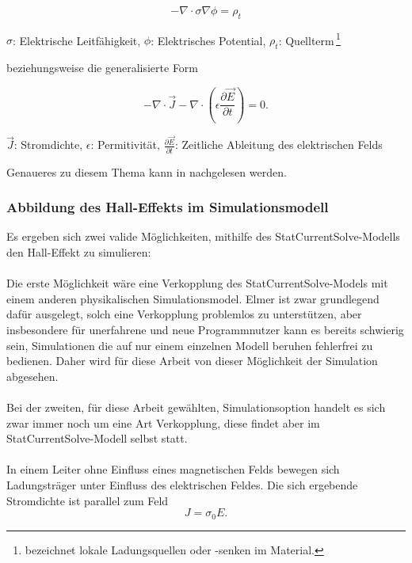 \documentclass[12pt, a4paper]{article}
\renewcommand{\footnotesize}{\fontsize{10pt}{12pt}\selectfont}
\begin{document}
\begin{equation}
	-\nabla\cdot\sigma\nabla\phi=\rho_t
	\tag{4.7}
	\label{4.7}
\end{equation}

\vspace{-0.8em}
\begin{center}
	\footnotesize
	$\sigma$: Elektrische Leitfähigkeit, $\phi$: Elektrisches Potential, $\rho_t$: Quellterm\,\footnote{bezeichnet lokale Ladungsquellen oder -senken im Material.}
\end{center}
\raggedright

beziehungsweise die generalisierte Form

\begin{equation}
	-\nabla\cdot\vec{J}-\nabla\cdot(\epsilon\frac{\partial\vec{E}}{\partial{t}})=0.
	\tag{4.8}
	\label{4.8}
\end{equation}

\vspace{-0.8em}
\begin{center}
	\footnotesize
	$\vec{J}$: Stromdichte, $\epsilon$: Permitivität, $\frac{\partial\vec{E}}{\partial{t}}$: Zeitliche Ableitung des elektrischen Felds
\end{center}

Genaueres zu diesem Thema kann in \cite{elmerModel} nachgelesen werden.

\subsubsection{Abbildung des Hall-Effekts im Simulationsmodell}
Es ergeben sich zwei valide Möglichkeiten, mithilfe des StatCurrentSolve-Modells den Hall-Effekt zu simulieren:\paragraph{}
Die erste Möglichkeit wäre eine Verkopplung des StatCurrentSolve-Models mit einem anderen physikalischen Simulationsmodel. Elmer ist zwar grundlegend dafür ausgelegt, solch eine Verkopplung problemlos zu unterstützen, aber insbesondere für unerfahrene und neue Programmnutzer kann es bereits schwierig sein, Simulationen die auf nur einem einzelnen Modell beruhen fehlerfrei zu bedienen. Daher wird für diese Arbeit von dieser Möglichkeit der Simulation abgesehen.\paragraph{}
Bei der zweiten, für diese Arbeit gewählten, Simulationsoption handelt es sich zwar immer noch um eine Art Verkopplung, diese findet aber im StatCurrentSolve-Modell selbst statt.\paragraph{}
In einem Leiter ohne Einfluss eines magnetischen Felds bewegen sich Ladungsträger unter Einfluss des elektrischen Feldes. Die sich ergebende Stromdichte ist parallel zum Feld
\begin{equation}
	J=\sigma_0E.
	\tag{4.9}
	\label{4.9}
\end{equation}
\end{document}
